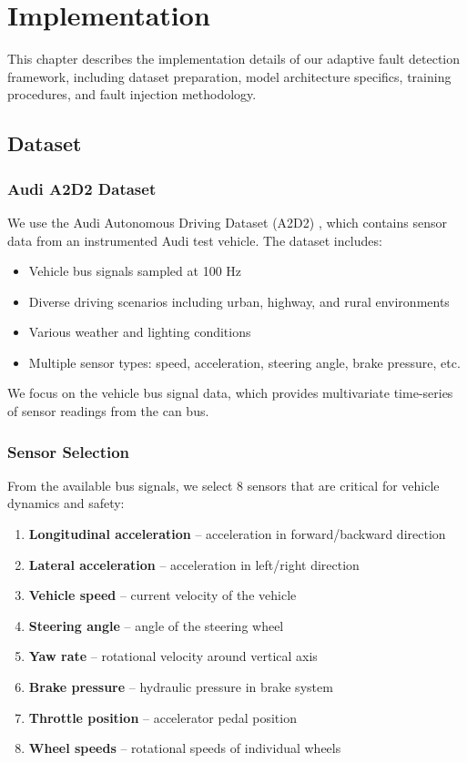 \chapter{Implementation}
\label{chap:implementation}

This chapter describes the implementation details of our adaptive fault detection framework, including dataset preparation, model architecture specifics, training procedures, and fault injection methodology.

\section{Dataset}

\subsection{Audi A2D2 Dataset}

We use the Audi Autonomous Driving Dataset (A2D2) \parencite{geiger2020a2d2}, which contains sensor data from an instrumented Audi test vehicle. The dataset includes:

\begin{itemize}
    \item Vehicle bus signals sampled at 100 Hz
    \item Diverse driving scenarios including urban, highway, and rural environments
    \item Various weather and lighting conditions
    \item Multiple sensor types: speed, acceleration, steering angle, brake pressure, etc.
\end{itemize}

We focus on the vehicle bus signal data, which provides multivariate time-series of sensor readings from the \gls{can} bus.

\subsection{Sensor Selection}

From the available bus signals, we select 8 sensors that are critical for vehicle dynamics and safety:

\begin{enumerate}
    \item \textbf{Longitudinal acceleration} -- acceleration in forward/backward direction
    \item \textbf{Lateral acceleration} -- acceleration in left/right direction
    \item \textbf{Vehicle speed} -- current velocity of the vehicle
    \item \textbf{Steering angle} -- angle of the steering wheel
    \item \textbf{Yaw rate} -- rotational velocity around vertical axis
    \item \textbf{Brake pressure} -- hydraulic pressure in brake system
    \item \textbf{Throttle position} -- accelerator pedal position
    \item \textbf{Wheel speeds} -- rotational speeds of individual wheels
\end{enumerate}

